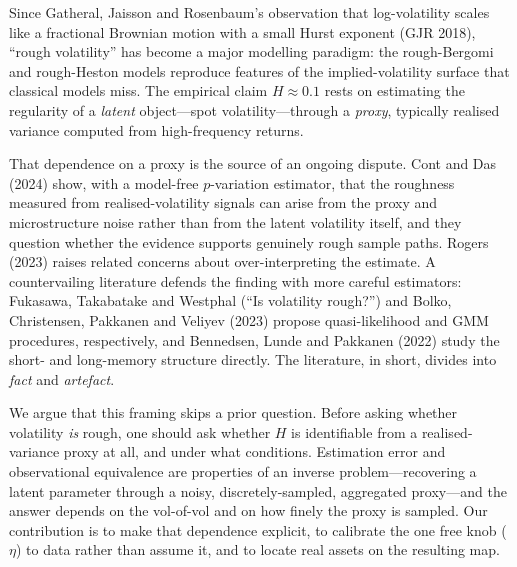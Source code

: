 \documentclass[11pt]{article}
\begin{document}
Since Gatheral, Jaisson and Rosenbaum's observation that log-volatility scales
like a fractional Brownian motion with a small Hurst exponent (GJR 2018),
``rough volatility'' has become a major modelling paradigm: the rough-Bergomi and
rough-Heston models reproduce features of the implied-volatility surface that
classical models miss. The empirical claim $H \approx 0.1$ rests on estimating the
regularity of a \emph{latent} object---spot volatility---through a \emph{proxy},
typically realised variance computed from high-frequency returns.

That dependence on a proxy is the source of an ongoing dispute. Cont and Das
(2024) show, with a model-free $p$-variation estimator, that the roughness measured
from realised-volatility signals can arise from the proxy and microstructure noise
rather than from the latent volatility itself, and they question whether the
evidence supports genuinely rough sample paths. Rogers (2023) raises related
concerns about over-interpreting the estimate. A countervailing literature defends
the finding with more careful estimators: Fukasawa, Takabatake and Westphal
(``Is volatility rough?'') and Bolko, Christensen, Pakkanen and Veliyev (2023)
propose quasi-likelihood and GMM procedures, respectively, and Bennedsen, Lunde and
Pakkanen (2022) study the short- and long-memory structure directly. The
literature, in short, divides into \emph{fact} and \emph{artefact}.

We argue that this framing skips a prior question. Before asking whether volatility
\emph{is} rough, one should ask whether $H$ is identifiable from a realised-variance
proxy at all, and under what conditions. Estimation error and observational
equivalence are properties of an inverse problem---recovering a latent parameter
through a noisy, discretely-sampled, aggregated proxy---and the answer depends on
the vol-of-vol and on how finely the proxy is sampled. Our contribution is to make
that dependence explicit, to calibrate the one free knob ($\eta$) to data rather
than assume it, and to locate real assets on the resulting map.
\end{document}
